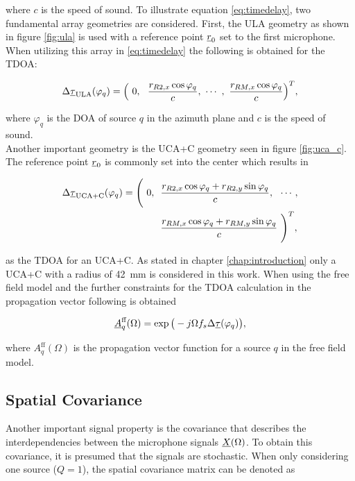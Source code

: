 where $c$ is the speed of sound. To illustrate equation \ref{eq:timedelay}, two fundamental array geometries are considered. First, the \ac{ULA} geometry as shown in figure \ref{fig:ula} is used with a reference point $\underline{r}_0$ set to the first microphone. When utilizing this array in \ref{eq:timedelay} the following is obtained for the \ac{TDOA}:

\begin{equation}
\Delta\vect{\tau}_{\text{ULA}}(\varphi_q)=\Big(\ 0,\ \ \frac{r_{R2,x}\cos\varphi_q}{c},\ \cdots\ ,\ \frac{r_{RM,x}\cos\varphi_q}{c}\Big)^T,
\label{eq:ula}
\end{equation}

where $\varphi_q$ is the \ac{DOA} of source $q$ in the azimuth plane and $c$ is the speed of sound.\\
Another important geometry is the \ac{UCA+C} geometry seen in figure \ref{fig:uca_c}. The reference point $\underline{r}_0$ is commonly set into the center which results in

\begin{equation}
\begin{split}
\Delta\underline{\tau}_{\text{UCA+C}}(\varphi_q)=\Bigg(\ 0, \ \ & \frac{r_{R2,x}\cos\varphi_q+r_{R2,y}\sin\varphi_q}{c},\ \ \cdots ,\\ & \frac{r_{RM,x}\cos\varphi_q+r_{RM,y}\sin\varphi_q}{c}\ \Bigg)^T,\\
\end{split}
\label{eq:uca_c}
\end{equation}


as the \ac{TDOA} for an \ac{UCA+C}. As stated in chapter \ref{chap:introduction} only a \ac{UCA+C} with a radius of \SI{42}{\milli \metre} is considered in this work. When using the free field model and the further constraints for the \ac{TDOA} calculation in the propagation vector following is obtained

\begin{equation}
\underline{A}_q^{\text{ff}}(\Omega) = \exp\big(-j\Omega f_s \Delta\underline{\tau}(\varphi_q)\big),
\label{eq:transfer_free_field}
\end{equation}

where $A_q^{\text{ff}}(\Omega)$ is the propagation vector function for a source $q$ in the free field model.

\subsection{Spatial Covariance}
\label{subsec:spatial_cov}
Another important signal property is the covariance that describes the interdependencies between the microphone signals $\underline{X}(\Omega)$. To obtain this covariance, it is presumed that the signals are stochastic. When only considering one source ($Q=1$),
the spatial covariance matrix can be denoted as

